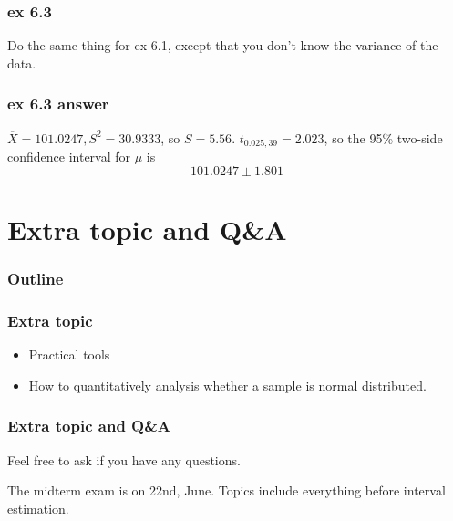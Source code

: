 \documentclass{beamer}
\begin{document}
\begin{frame}
    \frametitle{ex 6.3}

    Do the same thing for ex 6.1, except that you don't know the variance of the data.

\end{frame}

\begin{frame}
    \frametitle{ex 6.3 answer}

    $\overline{X}=101.0247, S^2=30.9333$, so $S=5.56$. $t_{0.025,39}=2.023$, so the 95\% two-side confidence interval for $\mu$ is 
    \[101.0247\pm 1.801\]

\end{frame}

\section{Extra topic and Q\&A}
\begin{frame}
    \frametitle{Outline}
    \tableofcontents[currentsection]
\end{frame}

\begin{frame}
    \frametitle{Extra topic}
    \begin{itemize}
        \item Practical tools
        \item How to quantitatively analysis whether a sample is normal distributed.
    \end{itemize}
    

\end{frame}


\begin{frame}
    \frametitle{Extra topic and Q\&A}
    
    Feel free to ask if you have any questions.\par
    The midterm exam is on 22nd, June. Topics include everything before interval estimation.
    
    
\end{frame}
\end{document}
